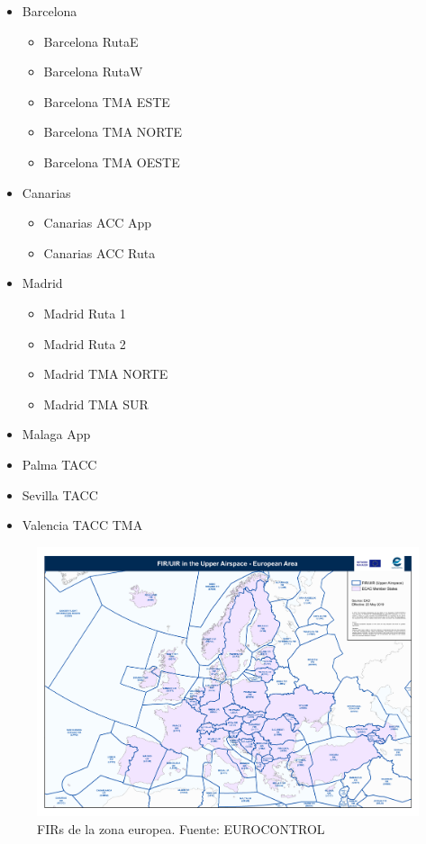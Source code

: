 \begin{itemize}
    \item Barcelona
    \begin{itemize}
        \item Barcelona RutaE
        \item Barcelona RutaW
        \item Barcelona TMA ESTE
        \item Barcelona TMA NORTE
        \item Barcelona TMA OESTE
    \end{itemize}
    \item Canarias
    \begin{itemize}
        \item Canarias ACC App
        \item Canarias ACC Ruta
    \end{itemize}
    \item Madrid
    \begin{itemize}
        \item Madrid Ruta 1
        \item Madrid Ruta 2
        \item Madrid TMA NORTE
        \item Madrid TMA SUR
    \end{itemize}
    \item Malaga App
    \item Palma TACC
    \item Sevilla TACC
    \item  Valencia TACC TMA
\end{itemize}


\begin{figure}[htbp]
    \centering
    \includegraphics[width=\linewidth]{FIR_europa}
    \caption{FIRs de la zona europea. Fuente: EUROCONTROL}
    \label{fig:2:fireuropa}
\end{figure}

